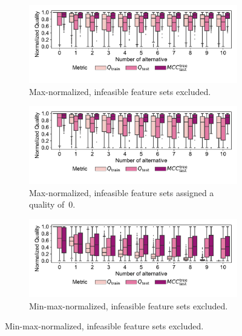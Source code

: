 \documentclass{article}
\theoremstyle{definition}
\begin{document}
\begin{figure}[p]
	\centering
	\begin{subfigure}[t]{\textwidth}
		\centering
		\includegraphics[width=\textwidth, trim=15 30 15 15, clip]{plots/afs-impact-num-alternatives-quality-max.pdf}
		\caption{Max-normalized, infeasible feature sets excluded.}
		\label{fig:afs:impact-num-alternatives-quality-max}
	\end{subfigure}
	\begin{subfigure}[t]{\textwidth}
		\centering
		\includegraphics[width=\textwidth, trim=15 30 15 15, clip]{plots/afs-impact-num-alternatives-quality-max-fillna.pdf}
		\caption{Max-normalized, infeasible feature sets assigned a quality of~0.}
		\label{fig:afs:impact-num-alternatives-quality-max-fillna}
	\end{subfigure}
	\begin{subfigure}[t]{\textwidth}
		\centering
		\includegraphics[width=\textwidth, trim=15 30 15 15, clip]{plots/afs-impact-num-alternatives-quality-min-max.pdf}
		\caption{Min-max-normalized, infeasible feature sets excluded.}

\end{subfigure}
\end{figure}
\end{document}
